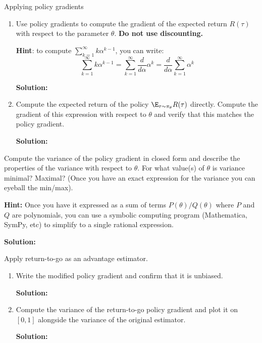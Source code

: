\documentclass{article}
\begin{document}
\begin{enumerate}
 Applying policy gradients
\begin{enumerate}
    \item Use policy gradients to compute the gradient of the expected return $R(\tau)$ with respect to the parameter $\theta$. \textbf{Do not use discounting.}

    \textbf{Hint}: to compute $\sum_{k=1}^\infty k\alpha^{k-1}$, you can write:
    \[\sum_{k=1}^\infty k\alpha^{k-1} = \sum_{k=1}^\infty \frac{d}{d\alpha}\alpha^k = \frac{d}{d\alpha}\sum_{k=1}^\infty\alpha^k\]

\textbf{Solution:}

    \item \label{exact_gradient} Compute the expected return of the policy $\E_{\tau \sim \pi_\theta} R(\tau)$ directly. Compute the gradient of this expression with respect to $\theta$ and verify that this matches the policy gradient.

\textbf{Solution:}

\end{enumerate}
\newpage
{} Compute the variance of the policy gradient in closed form and describe the properties of the variance with respect to $\theta$. For what value(s) of $\theta$ is variance minimal? Maximal? (Once you have an exact expression for the variance you can eyeball the min/max).

\textbf{Hint:}  Once you have it expressed as a sum of terms $P(\theta)/Q(\theta)$ where $P$ and $Q$ are polynomials, you can use a symbolic computing program (Mathematica, SymPy, etc) to simplify to a single rational expression.

\textbf{Solution:}

\newpage
{} Apply return-to-go as an advantage estimator.
\begin{enumerate}
    \item Write the modified policy gradient and confirm that it is unbiased.

\textbf{Solution:}

    \item Compute the variance of the return-to-go policy gradient and plot it on $[0, 1]$ alongside the variance of the original estimator.

\textbf{Solution:}


\end{enumerate}
\end{enumerate}
\end{document}
